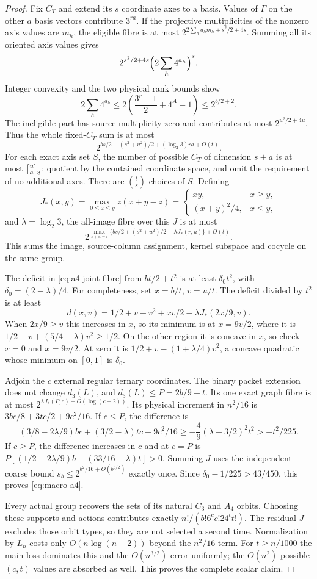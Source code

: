 \begin{proof}
Fix $C_T$ and extend its $s$ coordinate axes to a basis. Values of
$\Gamma$ on the other $a$ basis vectors contribute $3^{ra}$.
If the projective multiplicities of the nonzero axis values are
$m_h$, the eligible fibre is at most
$2^{2\sum_h a_hm_h+s^2/2+4s}$. Summing all its oriented axis
values gives
\[
 2^{s^2/2+4s}\Bigl(2\sum_h4^{a_h}\Bigr)^s.
\]
Integer convexity and the two physical rank bounds show
\[
 2\sum_h4^{a_h}
 \leq 2\left(\frac{3^r-1}{2}+4^A-1\right)
 \leq2^{b/2+2}.
\]
The ineligible part has source multiplicity zero and contributes
at most $2^{u^2/2+4u}$. Thus the whole fixed-$C_T$ sum is at most
\[
 2^{bs/2+(s^2+u^2)/2+(\log_2 3)ra+O(t)}.
\]
For each exact axis set $S$, the number of possible $C_T$ of
dimension $s+a$ is at most $\gauss ua3$: quotient by the contained
coordinate space, and omit the requirement of no additional axes.
There are $\binom ts$ choices of $S$. Defining
\[
 J_*(x,y)=\max_{0\leq z\leq y}z(x+y-z)
   =\begin{cases}xy,&x\geq y,\\(x+y)^2/4,&x\leq y,
    \end{cases}
\]
and $\lambda=\log_2 3$, the all-image fibre over this $J$ is at most
\begin{equation}\label{eq:a4-joint-fibre}
 2^{\max_{s+u=t}\{bs/2+(s^2+u^2)/2+\lambda J_*(r,u)\}+O(t)}.
\end{equation}
This sums the image, source-column assignment, kernel subspace and
cocycle on the same group.

The deficit in \eqref{eq:a4-joint-fibre} from $bt/2+t^2$ is
at least $\delta_0t^2$, with $\delta_0=(2-\lambda)/4$.
For completeness, set $x=b/t$, $v=u/t$. The deficit divided by
$t^2$ is at least
\[
 d(x,v)=1/2+v-v^2+xv/2-\lambda J_*(2x/9,v).
\]
When $2x/9\geq v$ this increases in $x$, so its minimum is at
$x=9v/2$, where it is $1/2+v+(5/4-\lambda)v^2\geq1/2$.
On the other region it is concave in $x$, so check $x=0$ and
$x=9v/2$. At zero it is $1/2+v-(1+\lambda/4)v^2$, a concave
quadratic whose minimum on $[0,1]$ is $\delta_0$.

Adjoin the $c$ external regular ternary coordinates. The binary
packet extension does not change $d_3(L)$, and
$d_3(L)\leq P=2b/9+t$. Its one exact graph fibre is at most
$2^{\lambda J_*(P,c)+O(\log(c+2))}$. Its physical increment
in $n^2/16$ is $3bc/8+3tc/2+9c^2/16$. If $c\leq P$, the
difference is
\[
 (3/8-2\lambda/9)bc+(3/2-\lambda)tc+9c^2/16
             \geq-\frac49(\lambda-3/2)^2t^2>-t^2/225.
\]
If $c\geq P$, the difference increases in $c$ and at $c=P$ is
$P[(1/2-2\lambda/9)b+(33/16-\lambda)t]>0$.
Summing $J$ uses the independent coarse bound
$s_b\leq2^{b^2/16+O(b^{3/2})}$ exactly once. Since
$\delta_0-1/225>43/450$, this proves \eqref{eq:macro-a4}.

Every actual group recovers the sets of its natural $C_3$ and
$A_4$ orbits. Choosing these supports and actions contributes exactly
$n!/(b!6^cc!24^tt!)$. The residual $J$ excludes those orbit types,
so they are not selected a second time. Normalization by $L_n$
costs only $O(n\log(n+2))$ beyond the $n^2/16$ term.
For $t\geq n/1000$ the main loss dominates this and the
$O(n^{3/2})$ error uniformly; the $O(n^2)$ possible $(c,t)$
values are absorbed as well. This proves the complete scalar claim.
\end{proof}
